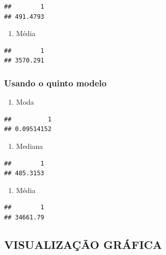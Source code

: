 \documentclass[]{article}
\providecommand{\tightlist}{%
  \setlength{\itemsep}{0pt}\setlength{\parskip}{0pt}}
\begin{document}
\begin{verbatim}
##        1 
## 491.4793
\end{verbatim}

\begin{enumerate}
\def\labelenumi{\alph{enumi}.}
\setcounter{enumi}{2}
\tightlist
\item
  Média
\end{enumerate}

\begin{verbatim}
##        1 
## 3570.291
\end{verbatim}

\subsubsection{Usando o quinto modelo}\label{usando-o-quinto-modelo}

\begin{enumerate}
\def\labelenumi{\alph{enumi}.}
\tightlist
\item
  Moda
\end{enumerate}

\begin{verbatim}
##          1 
## 0.09514152
\end{verbatim}

\begin{enumerate}
\def\labelenumi{\alph{enumi}.}
\setcounter{enumi}{1}
\tightlist
\item
  Mediana
\end{enumerate}

\begin{verbatim}
##        1 
## 485.3153
\end{verbatim}

\begin{enumerate}
\def\labelenumi{\alph{enumi}.}
\setcounter{enumi}{2}
\tightlist
\item
  Média
\end{enumerate}

\begin{verbatim}
##        1 
## 34661.79
\end{verbatim}

\subsection{VISUALIZAÇÃO GRÁFICA}\label{visualizacao-grafica}
\end{document}
